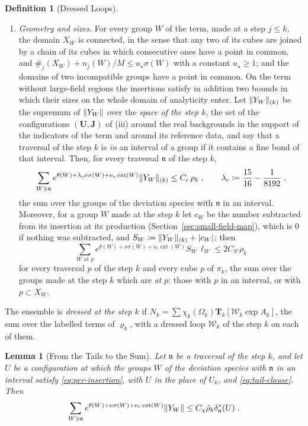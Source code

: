 \documentclass[11pt]{preprint}
\DeclarePairedDelimiter{\abs}{\lvert}{\rvert}
\DeclarePairedDelimiter{\norm}{\lVert}{\rVert}
\numberwithin{equation}{section}
\newtheorem{lemma}[theorem]{Lemma}
\theoremstyle{definition}
\newtheorem{definition}[theorem]{Definition}
\theoremstyle{remark}
\theoremstyle{plain}
\begin{document}
\begin{definition}[Dressed Loops]
\begin{enumerate}[label=(\roman*)]
\item \emph{Geometry and sizes.} For every group $W$ of the term, made at a step $j \leq k$, the domain $X_W$ is connected, in the sense that any two of its cubes are joined by a chain of its cubes in which consecutive ones have a point in common, and $\#_j(X_W) + n_j(W)/M \leq u_\star\sigma(W)$ with a constant $u_\star \geq 1$; and the domains of two incompatible groups have a point in common. On the term without large-field regions the insertions satisfy in addition two bounds in which their sizes on the whole domain of analyticity enter. Let $\norm{Y_W}_{(k)}$ be the supremum of $\norm{Y_W}$ over the \emph{space of the step $k$}, the set of the configurations $(\mathbf U, \mathbf J)$ of (iii) around the real backgrounds in the support of the indicators of the term and around its reference data, and say that a traversal of the step $k$ is \emph{in} an interval of a group if it contains a fine bond of that interval. Then, for every traversal $\mathfrak n$ of the step $k$,
\begin{equation}\label{eq:sup-clause}
    \sum_{W \ni \mathfrak n}e^{\theta(W) + \lambda_c\nu\sigma(W) + \nu_e\operatorname{ext}(W)}\norm{Y_W}_{(k)} \leq C_c\,\rho_k\;,
    \qquad
    \lambda_c \coloneqq \frac{15}{16} - \frac{1}{8192}\;,
\end{equation}
the sum over the groups of the deviation species with $\mathfrak n$ in an interval. Moreover, for a group $W$ made at the step $k$ let $c_W$ be the number subtracted from its insertion at its production (Section~\ref{sec:small-field-map}), which is $0$ if nothing was subtracted, and $S_W \coloneqq \norm{Y_W}_{(k)} + \abs{c_W}$; then
\begin{equation}\label{eq:production-clause}
    \sum_{W \text{ at } p}e^{\theta(W) + \nu\sigma(W) + \nu_e\operatorname{ext}(W)}S_W\,\ell_W \leq 2C_{S'}\rho_k
\end{equation}
for every traversal $p$ of the step $k$ and every cube $p$ of $\pi_k$, the sum over the groups made at the step $k$ which are \emph{at} $p$: those with $p$ in an interval, or with $p \subset X_W$.
\end{enumerate}
The ensemble is \emph{dressed at the step $k$} if $N_k = \sum\chi_k(\Omega_k)\mathbf T_k[\mathcal W_k\exp A_k]$, the sum over the labelled terms of $\varrho_k$, with a dressed loop $\mathcal W_k$ of the step $k$ on each of them.
\end{definition}

\begin{lemma}[From the Tails to the Sum]\label{lem:tail-to-sum}
Let $\mathfrak n$ be a traversal of the step $k$, and let $U$ be a configuration at which the groups $W$ of the deviation species with $\mathfrak n$ in an interval satisfy \eqref{eq:per-insertion}, with $U$ in the place of $U_k$, and \eqref{eq:tail-clause}. Then
\begin{equation}\label{eq:weighted-deviation-sum}
    \sum_{W \ni \mathfrak n}e^{\theta(W) + \nu\sigma(W) + \nu_e\operatorname{ext}(W)}\norm{Y_W} \leq C_\chi\tilde\rho_k\delta^{*}_{\mathfrak n}(U)\;.
\end{equation}
\end{lemma}
\end{document}
